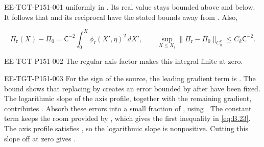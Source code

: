 %
\begin{EESegment}{EE-TGT-P151-001}
uniformly in . Its real value stays bounded above and below. It
follows that  and its
reciprocal have the stated bounds away from . Also,
\end{EESegment}
\begin{equation}
  \Pi_{\mathrm r}(X)-\Pi_0=\mathsf C^{-2}\int_0^X\phi_{\mathrm r}(X',\eta)^2\,dX',
  \qquad
  \sup_{X\leq X_i}\lVert\Pi_{\mathrm r}-\Pi_0\rVert_{C_\eta^k}\leq C_k\mathsf C^{-2}.
\tag{B.24}\label{eq:B.24}
\end{equation}
\begin{EESegment}{EE-TGT-P151-002}
The regular axis factor makes this integral finite at zero.
\end{EESegment}

\begin{EESegment}{EE-TGT-P151-003}
For the sign of the source, the leading gradient term is
. The bound
 shows that replacing
 by  creates an error bounded by
 after
 have been fixed. The logarithmic slope of the axis profile,
together with the remaining gradient, contributes . Absorb
these errors into a small fraction of , using
.
The constant term keeps the room provided by , which gives the first
inequality in \eqref{eq:B.23}. The axis profile satisfies , so the
logarithmic  slope is nonpositive. Cutting this slope off at zero gives
.
\end{EESegment}


